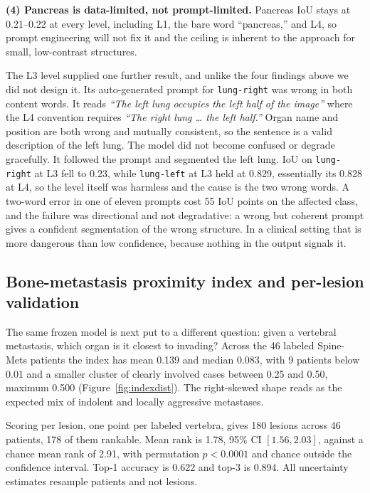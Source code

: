 \documentclass[10pt]{article}
\newcommand{\org}[1]{\texttt{#1}}
\begin{document}
\textbf{(4) Pancreas is data-limited, not prompt-limited.} Pancreas IoU stays at
0.21--0.22 at every level, including L1, the bare word ``pancreas,'' and L4, so
prompt engineering will not fix it and the ceiling is inherent to the approach for
small, low-contrast structures.

The L3 level supplied one further result, and unlike the four findings above we
did not design it. Its auto-generated
prompt for \org{lung-right} was wrong in both content words. It reads \emph{``The
left lung occupies the left half of the image''} where the L4 convention requires
\emph{``The right lung \ldots{} the left half.''} Organ name and position are both
wrong and mutually consistent, so the sentence is a valid description of the left
lung. The model did not become confused or degrade gracefully. It followed the
prompt and segmented the left lung. IoU on \org{lung-right} at L3 fell to 0.23,
while \org{lung-left} at L3 held at 0.829, essentially its 0.828 at L4, so the
level itself was harmless and the cause is the two wrong words. A two-word error
in one of eleven prompts cost 55 IoU points on the affected class, and the failure
was directional and not degradative: a wrong but coherent prompt gives a confident
segmentation of the wrong structure. In a clinical setting that is more dangerous
than low confidence, because nothing in the output signals it.

\subsection{Bone-metastasis proximity index and per-lesion validation}
\label{sec:results:index}

The same frozen model is next put to a different question: given a vertebral
metastasis, which organ is it closest to invading? Across the 46 labeled
Spine-Mets patients \cite{pieper2024spinemets} the index has mean 0.139 and median
0.083, with 9 patients below 0.01 and a smaller cluster of clearly involved cases
between 0.25 and 0.50, maximum 0.500 (Figure~\ref{fig:indexdist}). The
right-skewed shape reads as the expected mix of indolent and locally aggressive
metastases.

Scoring per lesion, one point per labeled vertebra, gives 180 lesions across 46
patients, 178 of them rankable. Mean rank is 1.78, 95\% CI $[1.56, 2.03]$, against
a chance mean rank of 2.91, with permutation $p<0.0001$ and chance outside the
confidence interval. Top-1 accuracy is 0.622 and top-3 is 0.894. All uncertainty
estimates resample patients and not lesions.
\end{document}
